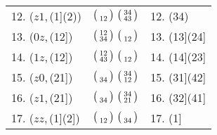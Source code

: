\documentclass{surv-l}
\numberwithin{equation}{section}
\numberwithin{table}{section}
\numberwithin{figure}{section}
\theoremstyle{plain}
\theoremstyle{definition}
\begin{document}
\begin{table}
{\begin{tabular}{@{}|l|c|l|@{}}
12. ($z1$,\,(1](2)) &$\big(\kern0.5pt\begin{smallmatrix}\vphantom{34}\\ 12\end{smallmatrix}\kern0.5pt\big)\ \big(\kern0.5pt\begin{smallmatrix}34 \\ 43\end{smallmatrix}\kern0.5pt\big)$ &12. (34) \\[3pt]
13. ($0z$,\,(12]) &$\big(\kern0.5pt\begin{smallmatrix}12 \\ 34\end{smallmatrix}\kern0.5pt\big)\ \big(\kern0.5pt\begin{smallmatrix}\vphantom{34}\\ 12\end{smallmatrix}\kern0.5pt\big)$ &13. (13](24] \\[3pt]
14. ($1z$,\,(12]) &$\big(\kern0.5pt\begin{smallmatrix}12 \\ 43\end{smallmatrix}\kern0.5pt\big)\ \big(\kern0.5pt\begin{smallmatrix}\vphantom{34}\\ 12\end{smallmatrix}\kern0.5pt\big)$ &14. (14](23] \\[3pt]
15. ($z0$,\,(21]) &$\big(\kern0.5pt\begin{smallmatrix}\vphantom{34}\\ 34\end{smallmatrix}\kern0.5pt\big)\ \big(\kern0.5pt\begin{smallmatrix}34 \\ 12\end{smallmatrix}\kern0.5pt\big)$ &15. (31](42] \\[3pt]
16. ($z1$,\,(21]) &$\big(\kern0.5pt\begin{smallmatrix}\vphantom{34}\\ 34\end{smallmatrix}\kern0.5pt\big)\ \big(\kern0.5pt\begin{smallmatrix}34 \\ 21\end{smallmatrix}\kern0.5pt\big)$ &16. (32](41] \\[3pt]
17. ($zz$,\,(1](2]) &$\big(\kern0.5pt\begin{smallmatrix}\vphantom{34}\\ 12\end{smallmatrix}\kern0.5pt\big)\ \big(\kern0.5pt\begin{smallmatrix}\vphantom{34}\\ 34\end{smallmatrix}\kern0.5pt\big)$ &17. (1] \\[3pt]
\hline
\end{tabular}}{}
\end{table}
\end{document}
